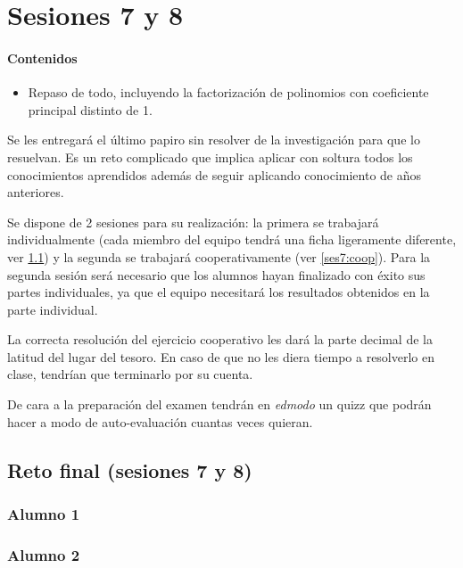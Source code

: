 \section{Sesiones 7 y 8}


\paragraph{Contenidos}
\begin{itemize}
	\item Repaso de todo, incluyendo la factorización de polinomios con coeficiente principal distinto de 1.
\end{itemize}

Se les entregará el último papiro sin resolver de la investigación para que lo resuelvan.
%
Es un reto complicado que implica aplicar con soltura todos los conocimientos aprendidos además de seguir aplicando conocimiento de años anteriores.


Se dispone de 2 sesiones para su realización: la primera se trabajará individualmente (cada miembro del equipo tendrá una ficha ligeramente diferente, ver \ref{ses7:indiv}) y la segunda se trabajará cooperativamente (ver \ref{ses7:coop}).
%
Para la segunda sesión será necesario que los alumnos hayan finalizado con éxito sus partes individuales, ya que el equipo necesitará los resultados obtenidos en la parte individual.

La correcta resolución del ejercicio cooperativo les dará la parte decimal de la latitud del lugar del tesoro.
%
En caso de que no les diera tiempo a resolverlo en clase, tendrían que terminarlo por su cuenta.

De cara a la preparación del examen tendrán en \textit{edmodo} un quizz que podrán hacer a modo de auto-evaluación cuantas veces quieran.

\subsection{Reto final (sesiones 7 y 8)}
\label{ses7:indiv}

\subsubsection{Alumno 1}


\subsubsection{Alumno 2}


